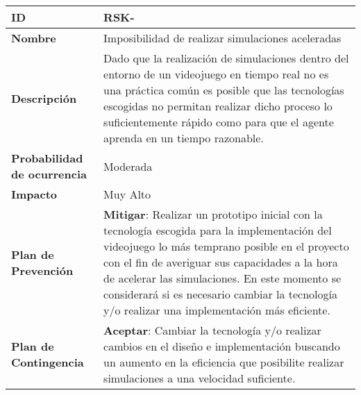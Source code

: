 \begin{center}
	\begin{tabular}{ | p{5.6cm} | p{8.5cm} | } 
		\hline
		
		\textbf{ID} & RSK-\arabic{contador_riesgos}
		{contador_riesgos} \\
		
		\hline 
		\textbf{Nombre} &
		Imposibilidad de realizar simulaciones aceleradas\\ 
		
		\hline
		\textbf{Descripción} & 
		Dado que la realización de simulaciones dentro del entorno de un videojuego en tiempo real no es una práctica común es posible que las tecnologías escogidas no permitan realizar dicho proceso lo suficientemente rápido como para que el agente aprenda en un tiempo razonable.\\
		
		\hline 
		\textbf{Probabilidad de ocurrencia} &
		Moderada\\
		
		\hline 
		\textbf{Impacto} &
		Muy Alto\\
		
		\hline 
		\textbf{Plan de Prevención} &
		\textbf{Mitigar}: Realizar un prototipo inicial con la tecnología escogida para la implementación del videojuego lo más temprano posible en el proyecto con el fin de averiguar sus capacidades a la hora de acelerar las simulaciones. En este momento se considerará si es necesario cambiar la tecnología y/o realizar una implementación más eficiente.\\
		
		\hline 
		\textbf{Plan de Contingencia} &
		\textbf{Aceptar}: Cambiar la tecnología y/o realizar cambios en el diseño e implementación buscando un aumento en la eficiencia que posibilite realizar simulaciones a una velocidad suficiente.\\
		
		
		\hline
	\end{tabular}
\end{center}

